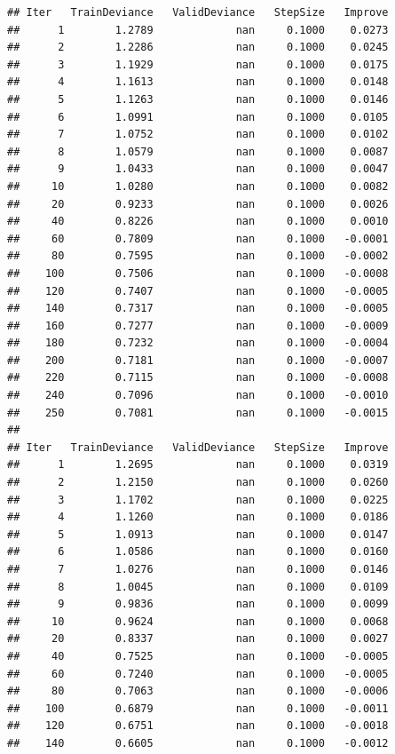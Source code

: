 \documentclass[]{book}
\begin{document}
\begin{verbatim}
## Iter   TrainDeviance   ValidDeviance   StepSize   Improve
##      1        1.2789             nan     0.1000    0.0273
##      2        1.2286             nan     0.1000    0.0245
##      3        1.1929             nan     0.1000    0.0175
##      4        1.1613             nan     0.1000    0.0148
##      5        1.1263             nan     0.1000    0.0146
##      6        1.0991             nan     0.1000    0.0105
##      7        1.0752             nan     0.1000    0.0102
##      8        1.0579             nan     0.1000    0.0087
##      9        1.0433             nan     0.1000    0.0047
##     10        1.0280             nan     0.1000    0.0082
##     20        0.9233             nan     0.1000    0.0026
##     40        0.8226             nan     0.1000    0.0010
##     60        0.7809             nan     0.1000   -0.0001
##     80        0.7595             nan     0.1000   -0.0002
##    100        0.7506             nan     0.1000   -0.0008
##    120        0.7407             nan     0.1000   -0.0005
##    140        0.7317             nan     0.1000   -0.0005
##    160        0.7277             nan     0.1000   -0.0009
##    180        0.7232             nan     0.1000   -0.0004
##    200        0.7181             nan     0.1000   -0.0007
##    220        0.7115             nan     0.1000   -0.0008
##    240        0.7096             nan     0.1000   -0.0010
##    250        0.7081             nan     0.1000   -0.0015
## 
## Iter   TrainDeviance   ValidDeviance   StepSize   Improve
##      1        1.2695             nan     0.1000    0.0319
##      2        1.2150             nan     0.1000    0.0260
##      3        1.1702             nan     0.1000    0.0225
##      4        1.1260             nan     0.1000    0.0186
##      5        1.0913             nan     0.1000    0.0147
##      6        1.0586             nan     0.1000    0.0160
##      7        1.0276             nan     0.1000    0.0146
##      8        1.0045             nan     0.1000    0.0109
##      9        0.9836             nan     0.1000    0.0099
##     10        0.9624             nan     0.1000    0.0068
##     20        0.8337             nan     0.1000    0.0027
##     40        0.7525             nan     0.1000   -0.0005
##     60        0.7240             nan     0.1000   -0.0005
##     80        0.7063             nan     0.1000   -0.0006
##    100        0.6879             nan     0.1000   -0.0011
##    120        0.6751             nan     0.1000   -0.0018
##    140        0.6605             nan     0.1000   -0.0012

\end{verbatim}
\end{document}
